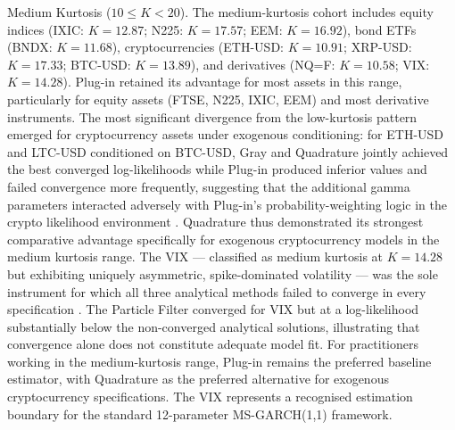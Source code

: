 \documentclass[12pt, a4paper]{article}
\begin{document}
Medium Kurtosis ($10 \le K < 20$).
The medium-kurtosis cohort includes equity indices (IXIC: $K = 12.87$; N225: $K = 17.57$; EEM: $K = 16.92$), bond ETFs (BNDX: $K = 11.68$), cryptocurrencies (ETH-USD: $K = 10.91$; XRP-USD: $K = 17.33$; BTC-USD: $K = 13.89$), and derivatives (NQ=F: $K = 10.58$; VIX: $K = 14.28$). Plug-in retained its advantage for most assets in this range, particularly for equity assets (FTSE, N225, IXIC, EEM) and most derivative instruments. The most significant divergence from the low-kurtosis pattern emerged for cryptocurrency assets under exogenous conditioning: for ETH-USD and LTC-USD conditioned on BTC-USD, Gray and Quadrature jointly achieved the best converged log-likelihoods while Plug-in produced inferior values and failed convergence more frequently, suggesting that the additional gamma parameters interacted adversely with Plug-in's probability-weighting logic in the crypto likelihood environment \citep{Augustyniak2014, Ardia2018}. Quadrature thus demonstrated its strongest comparative advantage specifically for exogenous cryptocurrency models in the medium kurtosis range. The VIX — classified as medium kurtosis at $K = 14.28$ but exhibiting uniquely asymmetric, spike-dominated volatility — was the sole instrument for which all three analytical methods failed to converge in every specification \citep{Catania2017}. The Particle Filter converged for VIX but at a log-likelihood substantially below the non-converged analytical solutions, illustrating that convergence alone does not constitute adequate model fit. For practitioners working in the medium-kurtosis range, Plug-in remains the preferred baseline estimator, with Quadrature as the preferred alternative for exogenous cryptocurrency specifications. The VIX represents a recognised estimation boundary for the standard 12-parameter MS-GARCH(1,1) framework.
\end{document}
